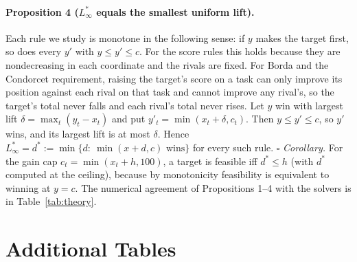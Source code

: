 \paragraph{Proposition 4 ($L_\infty^\ast$ equals the smallest uniform lift).}
Each rule we study is monotone in the following sense: if $y$ makes the target first, so does every $y'$ with $y\le y'\le c$.
For the score rules this holds because they are nondecreasing in each coordinate and the rivals are fixed. For Borda and the Condorcet requirement, raising the target's score on a task can only improve its position against each rival on that task and cannot improve any rival's, so the target's total never falls and each rival's total never rises.
Let $y$ win with largest lift $\delta=\max_t(y_t-x_t)$ and put $y'_t=\min(x_t+\delta,c_t)$. Then $y\le y'\le c$, so $y'$ wins, and its largest lift is at most $\delta$. Hence $L_\infty^\ast=d^\ast:=\min\{d:\ \min(x+d,c)\text{ wins}\}$ for every such rule. \hfill$\square$
\emph{Corollary.} For the gain cap $c_t=\min(x_t+h,100)$, a target is feasible iff $d^\ast\le h$ (with $d^\ast$ computed at the ceiling), because by monotonicity feasibility is equivalent to winning at $y=c$.
The numerical agreement of Propositions 1--4 with the solvers is in Table~\ref{tab:theory}.

\section{Additional Tables}
\label{app:tables}

\begin{table}[h]
\centering\footnotesize
\caption{Closed forms (P1 mean, P2 median, P3 minimum; P4: $L_\infty^\ast$ equals the smallest uniform lift) against the solvers on 31{,}080 instances sampled from the two matrices (task subsets, targets, caps): all agree; largest absolute differences are at most $10^{-6}$ (tolerance $10^{-4}$); feasibility status agrees on every instance.}
\label{tab:theory}
\begingroup\endgroup
\end{table}

\begin{table}[h]
\centering\footnotesize
\caption{Sensitivity to the strictness margin $\varepsilon$ (base $10^{-3}$): median ratio of $L_1^\ast$ for $\varepsilon=0.01$ and $0.1$ to the base, and the share of targets whose $K^\ast$ changes. ``feas.'' is the feasible share at the base margin (OLLB Borda and Condorcet: stratified sample). $^\dagger$ proxy cap.}
\label{tab:eps}
\begingroup\endgroup
\end{table}

